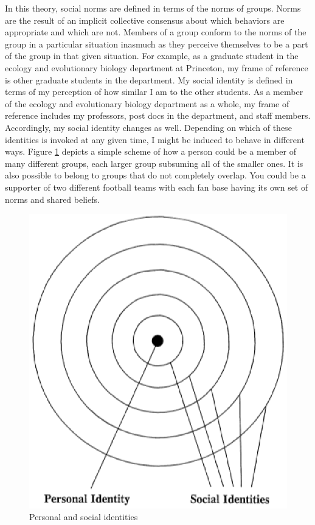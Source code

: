 \documentclass[rutwik_proposal.tex]{subfiles}
\begin{document}
In this theory, social norms are defined in terms of the norms of groups. Norms are the result of an implicit collective consensus about which behaviors are appropriate and which are not. Members of a group conform to the norms of the group in a particular situation inasmuch as they perceive themselves to be a part of the group in that given situation. For example, as a graduate student in the ecology and evolutionary biology department at Princeton, my frame of reference is other graduate students in the department. My social identity is defined in terms of my perception of how similar I am to the other students. As a member of the ecology and evolutionary biology department as a whole, my frame of reference includes my professors, post docs in the department, and staff members. Accordingly, my social identity changes as well. Depending on which of these identities is invoked at any given time, I might be induced to behave in different ways. Figure \ref{fig:soc_id} depicts a simple scheme of how a person could be a member of many different groups, each larger group subsuming all of the smaller ones. It is also possible to belong to groups that do not completely overlap. You could be a supporter of two different football teams with each fan base having its own set of norms and shared beliefs.

\begin{figure}[h]
\centering
\includegraphics{Images/multi_id}
\caption{Personal and social identities \cite{Brewer91}}
\label{fig:soc_id}
\end{figure}
\end{document}
